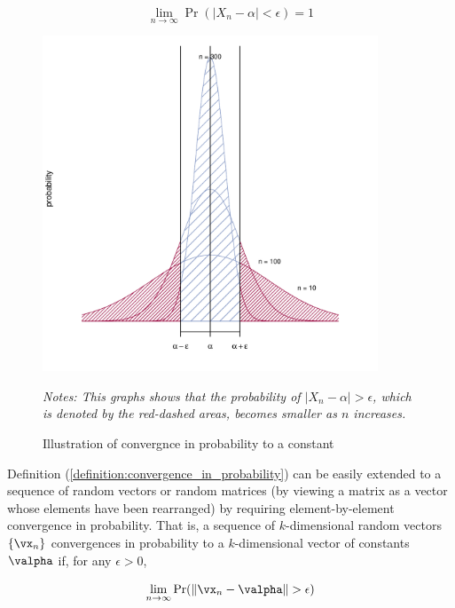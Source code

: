 \documentclass[english,12pt]{book}\usepackage[]{graphicx}\usepackage[]{xcolor}
\newenvironment{knitrout}{}{} %
\begin{document}
\begin{equation*}
	\lim_{n\to \infty} \Pr(\left|X_n-\alpha\right|<\epsilon)=1
\end{equation*}

\begin{figure}[ht]
  \caption{Illustration of convergnce in probability to a constant}
    \label{fig:convinprob}
    \centering
    \begin{minipage}{.9\linewidth}
\begin{knitrout}
\color{fgcolor}

{\centering \includegraphics[width=10cm,height=10cm]{figure/convinprob-1} 

}


\end{knitrout}
\footnotesize
		\emph{Notes: This graphs shows that the probability of $\left|X_n-\alpha\right|>\epsilon$, which is denoted by the red-dashed areas, becomes smaller as $n$ increases. }
	\end{minipage}
\end{figure}

Definition (\ref{definition:convergence_in_probability}) can be easily extended to a sequence of random vectors or random matrices (by viewing a matrix as a vector whose elements have been rearranged) by requiring element-by-element convergence in probability. That is, a sequence of $k$-dimensional random vectors $\left\{\vx_n\right\}$ convergences in probability to a $k$-dimensional vector of constants $\valpha$ if, for any $\epsilon>0$,

\begin{equation*}
\lim_{n\to \infty} \Pr(\left\lVert\vx_{n}-\valpha\right\rVert>\epsilon)
\end{equation*}
\end{document}
